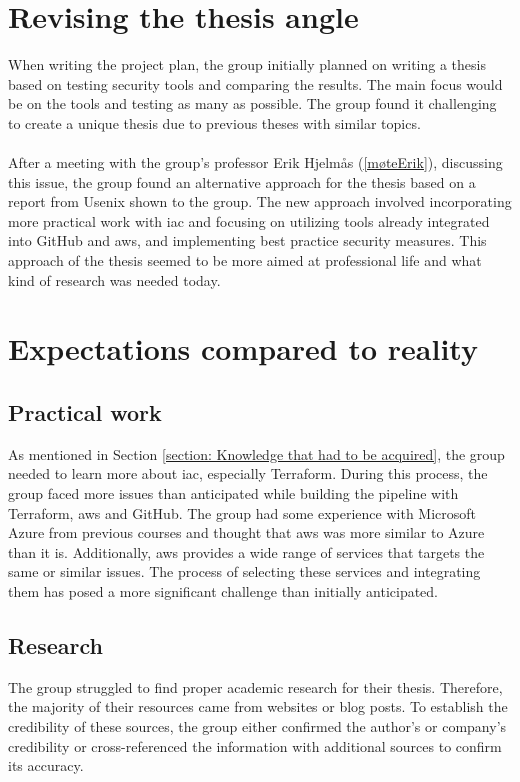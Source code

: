 \section{Revising the thesis angle}
When writing the project plan, the group initially planned on writing a thesis based on testing security tools and comparing the results. The main focus would be on the tools and testing as many as possible. The group found it challenging to create a unique thesis due to previous theses with similar topics. 
\\~\\
After a meeting with the group's professor Erik Hjelmås  (\ref{møteErik}), discussing this issue, the group found an alternative approach for the thesis based on a report from Usenix \cite{usenixreport} shown to the group. The new approach involved incorporating more practical work with \gls{iac} and focusing on utilizing tools already integrated into GitHub and \acrshort{aws}, and implementing best practice security measures. This approach of the thesis seemed to be more aimed at professional life and what kind of research was needed today.

\section{Expectations compared to reality}
\subsection{Practical work}
As mentioned in Section \ref{section: Knowledge that had to be acquired}, the group needed to learn more about \gls{iac}, especially Terraform. During this process, the group faced more issues than anticipated while building the \gls{pipeline} with Terraform, \acrshort{aws} and GitHub. The group had some experience with Microsoft Azure from previous courses and thought that \acrshort{aws} was more similar to Azure than it is. Additionally, \acrshort{aws} provides a wide range of services that targets the same or similar issues. The process of selecting these services and integrating them has posed a more significant challenge than initially anticipated. 

\subsection{Research}
The group struggled to find proper academic research for their thesis. Therefore, the majority of their resources came from websites or blog posts. To establish the credibility of these sources, the group either confirmed the author's or company's credibility or cross-referenced the information with additional sources to confirm its accuracy. 


